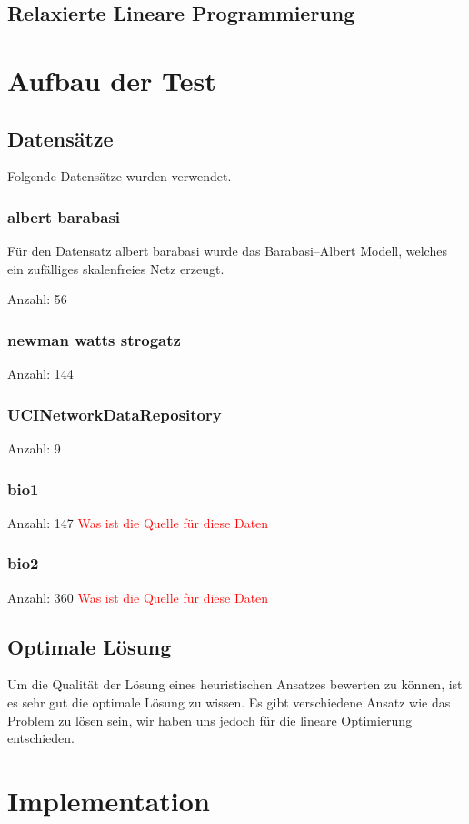 \documentclass[12pt,a4paper,onecolumn,oneside,titlepage]{article}
\newcommand\todo[1]{\textcolor{red}{#1}}
\begin{document}
\subsection{Relaxierte Lineare Programmierung}


\section{Aufbau der Test}
\subsection{Datensätze}
Folgende Datensätze wurden verwendet.
\subsubsection{albert barabasi}
Für den Datensatz albert barabasi wurde das Barabasi–Albert Modell, welches ein zufälliges skalenfreies Netz erzeugt.\cite{Albert02}

Anzahl: 56

\subsubsection{newman watts strogatz}
Anzahl: 144
\subsubsection{UCINetworkDataRepository}
Anzahl: 9
\subsubsection{bio1}
Anzahl: 147
\todo{Was ist die Quelle für diese Daten}
\subsubsection{bio2}
Anzahl: 360
\todo{Was ist die Quelle für diese Daten}

\subsection{Optimale Lösung}
Um die Qualität der Lösung eines heuristischen Ansatzes bewerten zu können, ist es sehr gut die optimale Lösung zu wissen. Es gibt verschiedene Ansatz wie das Problem zu lösen sein, wir haben uns jedoch für die lineare Optimierung entschieden.

\section{Implementation}
\end{document}
